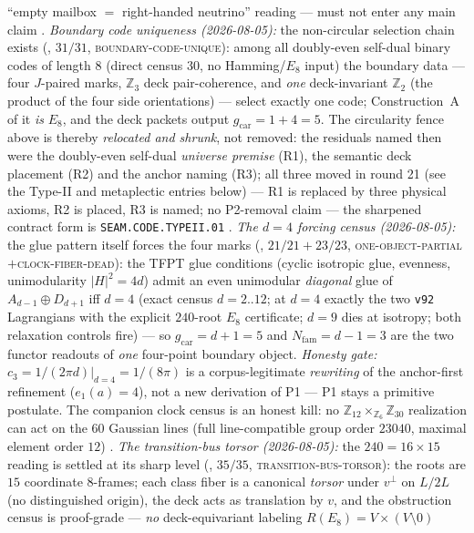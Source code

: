 \documentclass[11pt,a4paper]{article}
\newcommand{\gcar}{g_{\mathrm{car}}}
\newcommand{\Nfam}{N_{\mathrm{fam}}}
\newcommand{\Z}{\mathbb{Z}}
\theoremstyle{definition}
\begin{document}
\begin{keybox}
``empty mailbox $=$ right-handed neutrino'' reading --- must not
enter any main claim \mE.
\emph{Boundary code uniqueness (2026-08-05):} the non-circular
selection chain exists
(, $31/31$,
\textsc{boundary-code-unique}): among all doubly-even self-dual
binary codes of length $8$ (direct census $30$, no Hamming/$E_8$
input) the boundary data --- four $J$-paired marks, $\Z_3$ deck
pair-coherence, and \emph{one} deck-invariant $\Z_2$ (the product
of the four side orientations) --- select exactly one code;
Construction~A of it \emph{is} $E_8$, and the deck packets output
$\gcar=1+4=5$.  The circularity fence above is thereby
\emph{relocated and shrunk}, not removed: the residuals named then
were the doubly-even self-dual \emph{universe premise} (R1), the
semantic deck placement (R2) and the anchor naming (R3); all three
moved in round 21 (see the Type-II and metaplectic entries below)
--- R1 is replaced by three physical axioms, R2 is placed, R3 is
named; no P2-removal claim --- the sharpened contract form is
\texttt{SEAM.CODE.TYPEII.01} \mC.
\emph{The $d=4$ forcing census (2026-08-05):} the glue pattern
itself forces the four marks
(, $21/21+23/23$,
\textsc{one-object-partial}$+$\textsc{clock-fiber-dead}): the TFPT
glue conditions (cyclic isotropic glue, evenness, unimodularity
$|H|^2=4d$) admit an even unimodular \emph{diagonal} glue of
$A_{d-1}\oplus D_{d+1}$ iff $d=4$ (exact census $d=2..12$; at
$d=4$ exactly the two \texttt{v92} Lagrangians with the explicit
$240$-root $E_8$ certificate; $d=9$ dies at isotropy; both
relaxation controls fire) --- so $\gcar=d{+}1=5$ and
$\Nfam=d{-}1=3$ are the two functor readouts of \emph{one}
four-point boundary object.  \emph{Honesty gate:}
$c_3=1/(2\pi d)|_{d=4}=1/(8\pi)$ is a corpus-legitimate
\emph{rewriting} of the anchor-first refinement ($e_1(a)=4$), not
a new derivation of P1 --- P1 stays a primitive postulate.  The
companion clock census is an honest kill: no
$\Z_{12}\times_{\Z_6}\Z_{30}$ realization can act on the $60$
Gaussian lines (full line-compatible group order $23040$, maximal
element order $12$) \mE.
\emph{The transition-bus torsor (2026-08-05):} the $240=16\times15$
reading is settled at its sharp level
(, $35/35$,
\textsc{transition-bus-torsor}): the roots are $15$ coordinate
$8$-frames; each class fiber is a canonical \emph{torsor} under
$v^\perp$ on $L/2L$ (no distinguished origin), the deck acts as
translation by $v$, and the obstruction census is proof-grade ---
\emph{no} deck-equivariant labeling $R(E_8)=V\times(V\setminus0)$

\end{keybox}
\end{document}
